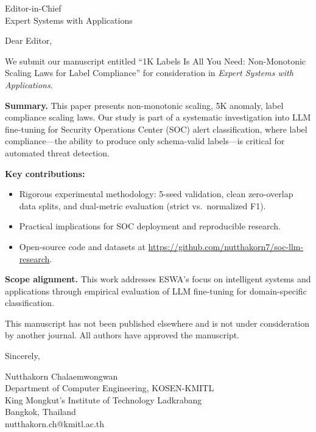 \documentclass[11pt]{letter}
\begin{document}
\begin{letter}{Editor-in-Chief \\ Expert Systems with Applications}

\opening{Dear Editor,}

We submit our manuscript entitled ``1K Labels Is All You Need: Non-Monotonic Scaling Laws for Label Compliance'' for consideration in \textit{Expert Systems with Applications}.

\textbf{Summary.} This paper presents non-monotonic scaling, 5K anomaly, label compliance scaling laws. Our study is part of a systematic investigation into LLM fine-tuning for Security Operations Center (SOC) alert classification, where label compliance---the ability to produce only schema-valid labels---is critical for automated threat detection.

\textbf{Key contributions:}
\begin{itemize}
\item Rigorous experimental methodology: 5-seed validation, clean zero-overlap data splits, and dual-metric evaluation (strict vs.\ normalized F1).
\item Practical implications for SOC deployment and reproducible research.
\item Open-source code and datasets at \url{https://github.com/nutthakorn7/soc-llm-research}.
\end{itemize}

\textbf{Scope alignment.} This work addresses ESWA's focus on intelligent systems and applications through empirical evaluation of LLM fine-tuning for domain-specific classification.

This manuscript has not been published elsewhere and is not under consideration by another journal. All authors have approved the manuscript.

\closing{Sincerely,}

Nutthakorn Chalaemwongwan \\
Department of Computer Engineering, KOSEN-KMITL \\
King Mongkut's Institute of Technology Ladkrabang \\
Bangkok, Thailand \\
nutthakorn.ch@kmitl.ac.th

\end{letter}
\end{document}
